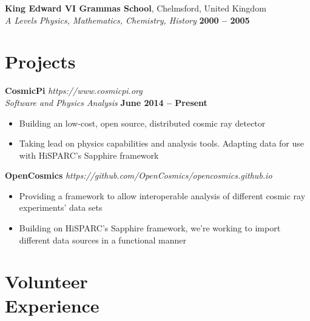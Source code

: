 \documentclass[margin,line]{resume}
\begin{document}
\begin{resume}
    \textbf{King Edward VI Grammas School}, Chelmsford, United Kingdom  \vspace{1mm}\\\vspace{1mm}%
    \textsl{A Levels Physics, Mathematics, Chemistry, History} \hfill \textbf{2000 -- 2005}\vspace{-3mm}\\\vspace{-1mm}%
\vspace{-1.5mm}

    \section{\mysidestyle Projects}


    \textbf{CosmicPi}  \hfill \textsl{https://www.cosmicpi.org}\\\vspace{1mm}%
    \textsl{Software and Physics Analysis} \hfill \textbf{June 2014 -- Present}\\
    \begin{itemize}
    \item{Building an low-cost, open source, distributed cosmic ray detector}
    \item{Taking lead on physics capabilities and analysis tools. Adapting data for use with HiSPARC's Sapphire framework}
    \end{itemize}


    \textbf{OpenCosmics} \hfill \textsl{https://github.com/OpenCosmics/opencosmics.github.io}\\\vspace{1mm}%
    \begin{itemize}
    \item{Providing a framework to allow interoperable analysis of different cosmic ray experiments' data sets}
    \item{Building on HiSPARC's Sapphire framework, we're working to import different data sources in a functional manner}
    \end{itemize}


    \section{\mysidestyle Volunteer\\Experience}



\end{resume}
\end{document}
